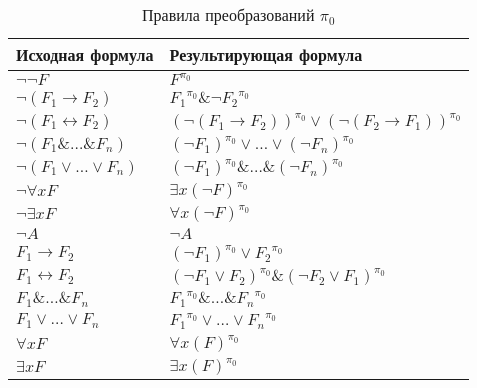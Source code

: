 \documentclass[a4paper]{jctart15b}
\begin{document}
\begin{table}[htbp]
	\caption{Правила преобразований $\pi_0$}\vspace*{2mm}
	
	\begin{tabular}{|l|l|}
		\hline
		\textbf{Исходная формула} & \textbf{Результирующая формула} \\
		\hline
		$\neg\neg F$ & $F^{\pi_0}$ \\
		
		\hline
		$\neg (F_1 \rightarrow F_2)$ & ${F_1}^{\pi_0} \& {\neg F_2}^{\pi_0}$ \\
		
		\hline
		$\neg (F_1 \leftrightarrow F_2)$ & $(\neg(F_1 \rightarrow F_2))^{\pi_0} \vee (\neg(F_2 \rightarrow F_1))^{\pi_0}$ \\
		
		\hline
		$\neg (F_1 \&\ldots\& F_n)$ & $(\neg F_1)^{\pi_0} \vee\ldots\vee (\neg F_n)^{\pi_0}$ \\
		
		\hline
		$\neg (F_1 \vee\ldots\vee F_n)$ & $(\neg F_1)^{\pi_0} \&\ldots\& (\neg F_n)^{\pi_0}$ \\
		
		\hline
		$\neg\forall{x}F$ & $\exists{x}(\neg F)^{\pi_0}$ \\ 
		
		\hline
		$\neg\exists{x}F$ & $\forall{x}(\neg F)^{\pi_0}$ \\
		
		\hline
		$\neg A$ & $\neg A$ \\
		
		\hline
		$F_1 \rightarrow F_2$ & $(\neg F_1)^{\pi_0} \vee {F_2}^{\pi_0}$ \\
		
		\hline
		$F_1 \leftrightarrow F_2$ & $(\neg F_1 \vee F_2)^{\pi_0} \& (\neg F_2 \vee F_1)^{\pi_0} $ \\
		
		\hline
		$F_1 \&\ldots\& F_n$ & ${F_1}^{\pi_0} \&\ldots\& {F_n}^{\pi_0} $ \\
		
		\hline
		$F_1 \vee\ldots\vee F_n$ & ${F_1}^{\pi_0} \vee\ldots\vee {F_n}^{\pi_0} $ \\
		
		\hline
		$\forall{x}F$ & $\forall{x}(F)^{\pi_0} $ \\
		
		\hline
		$\exists{x}F$ & $\exists{x}(F)^{\pi_0} $ \\
		
		\hline
	\end{tabular}
\end{table}
\end{document}
